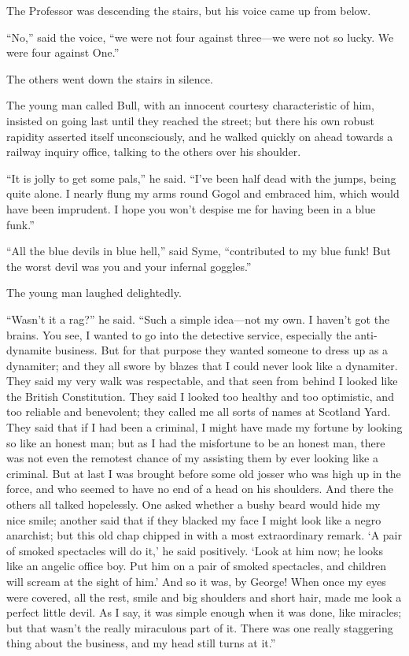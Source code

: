 The Professor was descending the stairs, but his voice came up from below.

“No,” said the voice, “we were not four against three⁠—we were not so lucky. We were four against One.”

The others went down the stairs in silence.

The young man called Bull, with an innocent courtesy characteristic of him, insisted on going last until they reached the street; but there his own robust rapidity asserted itself unconsciously, and he walked quickly on ahead towards a railway inquiry office, talking to the others over his shoulder.

“It is jolly to get some pals,” he said. “I’ve been half dead with the jumps, being quite alone. I nearly flung my arms round Gogol and embraced him, which would have been imprudent. I hope you won’t despise me for having been in a blue funk.”

“All the blue devils in blue hell,” said Syme, “contributed to my blue funk! But the worst devil was you and your infernal goggles.”

The young man laughed delightedly.

“Wasn’t it a rag?” he said. “Such a simple idea⁠—not my own. I haven’t got the brains. You see, I wanted to go into the detective service, especially the anti-dynamite business. But for that purpose they wanted someone to dress up as a dynamiter; and they all swore by blazes that I could never look like a dynamiter. They said my very walk was respectable, and that seen from behind I looked like the British Constitution. They said I looked too healthy and too optimistic, and too reliable and benevolent; they called me all sorts of names at Scotland Yard. They said that if I had been a criminal, I might have made my fortune by looking so like an honest man; but as I had the misfortune to be an honest man, there was not even the remotest chance of my assisting them by ever looking like a criminal. But at last I was brought before some old josser who was high up in the force, and who seemed to have no end of a head on his shoulders. And there the others all talked hopelessly. One asked whether a bushy beard would hide my nice smile; another said that if they blacked my face I might look like a negro anarchist; but this old chap chipped in with a most extraordinary remark. ‘A pair of smoked spectacles will do it,’ he said positively. ‘Look at him now; he looks like an angelic office boy. Put him on a pair of smoked spectacles, and children will scream at the sight of him.’ And so it was, by George! When once my eyes were covered, all the rest, smile and big shoulders and short hair, made me look a perfect little devil. As I say, it was simple enough when it was done, like miracles; but that wasn’t the really miraculous part of it. There was one really staggering thing about the business, and my head still turns at it.”

